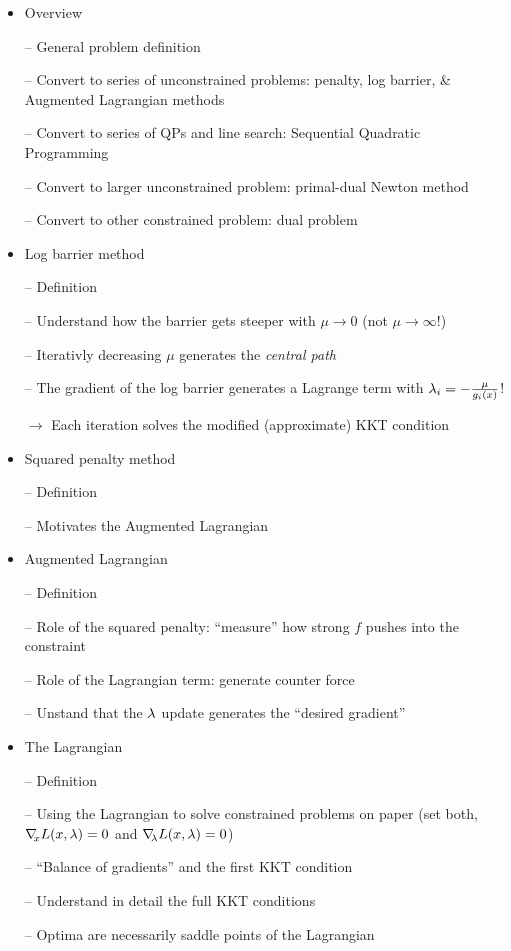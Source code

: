 \begin{itemize}
\item Overview

-- General problem definition

-- Convert to series of unconstrained problems: penalty, log barrier,
\& Augmented Lagrangian methods

-- Convert to series of QPs and line search: Sequential Quadratic Programming

-- Convert to larger unconstrained problem: primal-dual Newton method

-- Convert to other constrained problem: dual problem


\item Log barrier method

-- Definition

-- Understand how the barrier gets steeper with $\mu\to 0$ (not
$\mu\to\infty$!)

-- Iterativly decreasing $\mu$ generates the \emph{central path}

-- The gradient of the log barrier generates a Lagrange term with
$\lambda_i = -\frac{\mu}{g_i(x)}$!

$\to$ Each iteration solves the modified (approximate) KKT condition


\item Squared penalty method

-- Definition

-- Motivates the Augmented Lagrangian

\item Augmented Lagrangian

-- Definition

-- Role of the squared penalty: ``measure'' how strong $f$ pushes into
the constraint

-- Role of the Lagrangian term: generate counter force

-- Unstand that the $\lambda$ update generates the ``desired gradient''


\item The Lagrangian

-- Definition

-- Using the Lagrangian to solve constrained problems on paper (set both,
${\nabla_{\!\!}}_x L(x,\lambda) = 0 $ and ${\nabla_{\!\!}}_\lambda L(x,\lambda)=0$)

-- ``Balance of gradients'' and the first KKT condition

-- Understand in detail the full KKT conditions

-- Optima are necessarily saddle points of the Lagrangian


\end{itemize}
